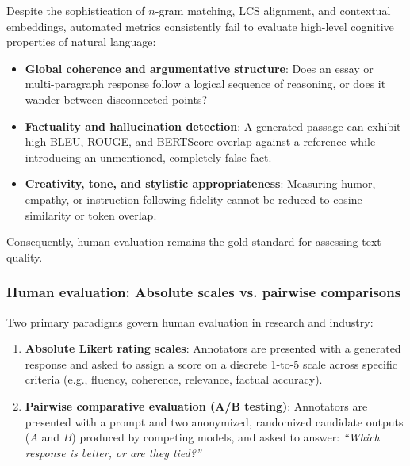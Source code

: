 \documentclass[../../../main.tex]{subfiles}
\begin{document}
Despite the sophistication of $n$-gram matching, LCS alignment, and contextual embeddings, automated metrics consistently fail to evaluate high-level cognitive properties of natural language:
\begin{itemize}
    \item \textbf{Global coherence and argumentative structure}: Does an essay or multi-paragraph response follow a logical sequence of reasoning, or does it wander between disconnected points?
    \item \textbf{Factuality and hallucination detection}: A generated passage can exhibit high BLEU, ROUGE, and BERTScore overlap against a reference while introducing an unmentioned, completely false fact.
    \item \textbf{Creativity, tone, and stylistic appropriateness}: Measuring humor, empathy, or instruction-following fidelity cannot be reduced to cosine similarity or token overlap.
\end{itemize}

Consequently, human evaluation remains the gold standard for assessing text quality.

\subsubsection{Human evaluation: Absolute scales vs. pairwise comparisons}
Two primary paradigms govern human evaluation in research and industry:
\begin{enumerate}
    \item \textbf{Absolute Likert rating scales}: Annotators are presented with a generated response and asked to assign a score on a discrete 1-to-5 scale across specific criteria (e.g., fluency, coherence, relevance, factual accuracy).
    \item \textbf{Pairwise comparative evaluation (A/B testing)}: Annotators are presented with a prompt and two anonymized, randomized candidate outputs ($A$ and $B$) produced by competing models, and asked to answer: \textit{``Which response is better, or are they tied?''}
\end{enumerate}
\end{document}
